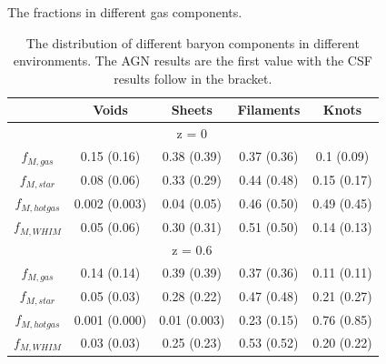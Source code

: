 \documentclass[aspectratio=43]{beamer}
\begin{document}
\begin{frame}{The fractions in different gas components.}
\begin{table}
\fontsize{10}{10}\selectfont
\caption{The distribution of different baryon components in different environments. The AGN results are the first value with the CSF results follow in the bracket.}
  \begin{tabular}{c|c|c|c|c}
       & Voids & Sheets & Filaments & Knots \\
       \hline
       & & z = 0 & & \\
       \hline
    $f_{M, gas}$ & 0.15 (0.16) & 0.38 (0.39) & 0.37 (0.36) & 0.1 (0.09) \\
    $f_{M, star}$ & 0.08 (0.06) & 0.33 (0.29) & 0.44 (0.48) & 0.15 (0.17) \\
    $f_{M, hot gas}$ & 0.002 (0.003) & 0.04 (0.05) & 0.46 (0.50) & 0.49 (0.45) \\
    $f_{M, WHIM}$ & 0.05 (0.06) & 0.30 (0.31) & \alert{0.51 (0.50)} & 0.14 (0.13) \\
    \hline
       & & z = 0.6 & & \\
       \hline
    $f_{M, gas}$ & 0.14 (0.14) & 0.39 (0.39) & 0.37 (0.36) & 0.11 (0.11) \\
    $f_{M, star}$ & 0.05 (0.03) & 0.28 (0.22) & 0.47 (0.48) & 0.21 (0.27) \\
    $f_{M, hot gas}$ & 0.001 (0.000) & 0.01 (0.003) & 0.23 (0.15) & 0.76 (0.85) \\
    $f_{M, WHIM}$ & 0.03 (0.03) & 0.25 (0.23) & \alert{0.53 (0.52)} & 0.20 (0.22) \\ 
  \end{tabular}
\end{table}
\end{frame}
\end{document}
